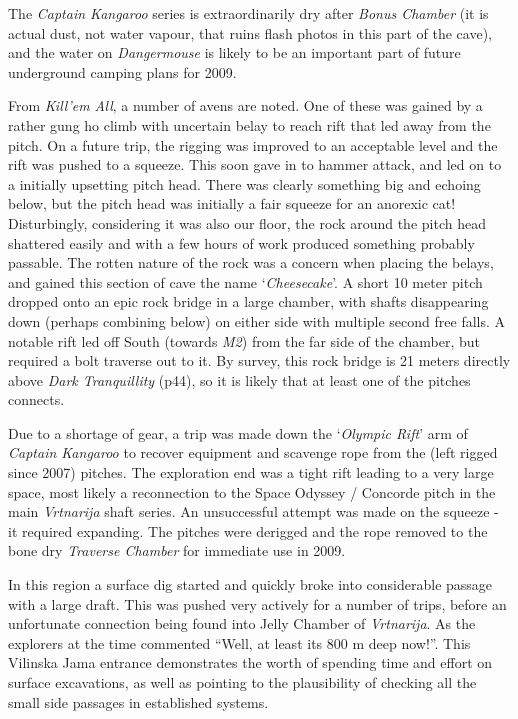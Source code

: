 The \emph{Captain Kangaroo} series is extraordinarily dry after
\emph{Bonus Chamber} (it is actual dust, not water vapour, that ruins
flash photos in this part of the cave), and the water on
\emph{Dangermouse} is likely to be an important part of future
underground camping plans for 2009.

From \emph{Kill'em All}, a number of avens are noted. One of these was
gained by a rather gung ho climb with uncertain belay to reach rift that
led away from the pitch. On a future trip, the rigging was improved to
an acceptable level and the rift was pushed to a squeeze. This soon gave
in to hammer attack, and led on to a initially upsetting pitch head.
There was clearly something big and echoing below, but the pitch head
was initially a fair squeeze for an anorexic cat! Disturbingly,
considering it was also our floor, the rock around the pitch head
shattered easily and with a few hours of work produced something
probably passable. The rotten nature of the rock was a concern when
placing the belays, and gained this section of cave the name
`\emph{Cheesecake}'. A short 10 meter pitch dropped onto an epic rock
bridge in a large chamber, with shafts disappearing down (perhaps
combining below) on either side with multiple second free falls. A
notable rift led off South (towards \emph{M2}) from the far side of the
chamber, but required a bolt traverse out to it. By survey, this rock
bridge is 21 meters directly above \emph{Dark Tranquillity} (p44), so it
is likely that at least one of the pitches connects.

Due to a shortage of gear, a trip was made down the `\emph{Olympic
Rift}' arm of \emph{Captain Kangaroo} to recover equipment and scavenge
rope from the (left rigged since 2007) pitches. The exploration end was
a tight rift leading to a very large space, most likely a reconnection
to the Space Odyssey / Concorde pitch in the main \emph{Vrtnarija} shaft
series. An unsuccessful attempt was made on the squeeze - it required
expanding. The pitches were derigged and the rope removed to the bone
dry \emph{Traverse Chamber} for immediate use in 2009.

In this region a surface dig started and quickly broke into considerable
passage with a large draft. This was pushed very actively for a number
of trips, before an unfortunate connection being found into Jelly
Chamber of \emph{Vrtnarija}. As the explorers at the time commented
``Well, at least its 800 m deep now!''. This Vilinska Jama entrance
demonstrates the worth of spending time and effort on surface
excavations, as well as pointing to the plausibility of checking all the
small side passages in established systems.

